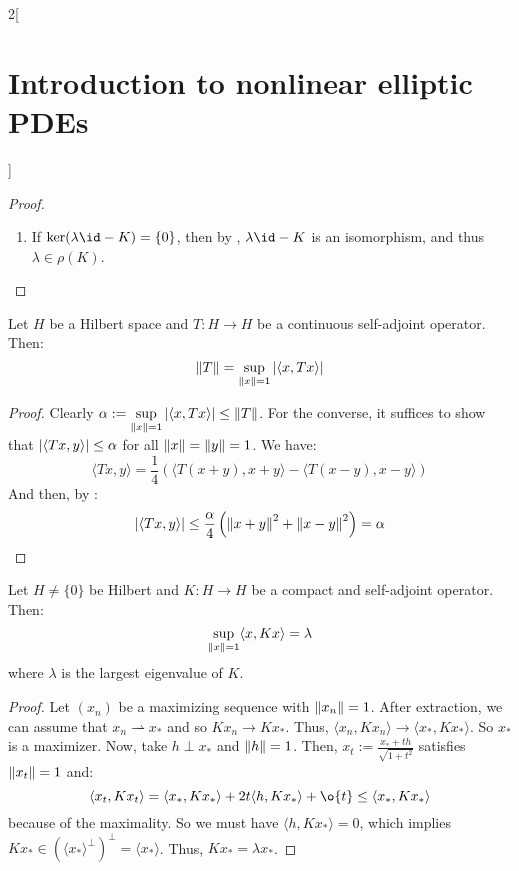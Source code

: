 \documentclass[../../../main_math.tex]{subfiles}
\begin{document}
\begin{multicols}{2}[\section{Introduction to nonlinear elliptic PDEs}]
\begin{proof}
\begin{enumerate}
      \item If $\ker(\lambda\id-K)=\{0\}$, then by , $\lambda\id-K$ is an isomorphism, and thus $\lambda\in \rho(K)$.
            \setcounter{enumi}{3}
    \end{enumerate}
  \end{proof}
  \begin{lemma}
    Let $H$ be a Hilbert space and $T:H\to H$ be a continuous self-adjoint operator. Then:
    $$
      \norm{T}=\sup_{\norm{x}=1}\abs{\langle x,Tx\rangle}
    $$
  \end{lemma}
  \begin{proof}
    Clearly $\displaystyle\alpha:=\sup_{\norm{x}=1}\abs{\langle x,Tx\rangle}\leq \norm{T}$. For the converse, it suffices to show that $\abs{\langle Tx,y\rangle}\leq \alpha$ for all $\norm{x}=\norm{y}=1$. We have:
    $$
      \langle Tx,y\rangle = \frac{1}{4}\left(\langle T(x+y),x+y\rangle-\langle T(x-y),x-y\rangle\right)
    $$
    And then, by :
    $$
      \abs{\langle Tx,y\rangle}\leq \frac{\alpha}{4}\left(\norm{x+y}^2+\norm{x-y}^2\right)= \alpha
    $$
  \end{proof}
  \begin{lemma}
    Let $H\ne\{ 0\}$ be Hilbert and $K:H\to H$ be a compact and self-adjoint operator. Then:
    $$
      \sup_{\norm{x}=1}\langle x,Kx\rangle=\lambda
    $$
    where $\lambda$ is the largest eigenvalue of $K$.
  \end{lemma}
  \begin{proof}
    Let $(x_n)$ be a maximizing sequence with $\norm{x_n}=1$. After extraction, we can assume that $x_n\rightharpoonup x_*$ and so $Kx_n\to Kx_*$. Thus, $\langle x_n,Kx_n\rangle\to \langle x_*,Kx_*\rangle$. So $x_*$ is a maximizer. Now, take $h\perp x_*$ and $\norm{h}=1$. Then, $x_t:=\frac{x_*+th}{\sqrt{1+t^2}}$ satisfies $\norm{x_t}=1$ and:
    $$
      \langle x_t,Kx_t\rangle=\langle x_*,Kx_*\rangle+2t\langle h,Kx_*\rangle+\o{t}\leq \langle x_*,Kx_*\rangle
    $$
    because of the maximality. So we must have $\langle h,Kx_*\rangle=0$, which implies $Kx_*\in {{({\langle x_*\rangle}^\perp)}^\perp}=\langle x_*\rangle$. Thus, $Kx_*=\lambda x_*$.
  \end{proof}

\end{multicols}
\end{document}
